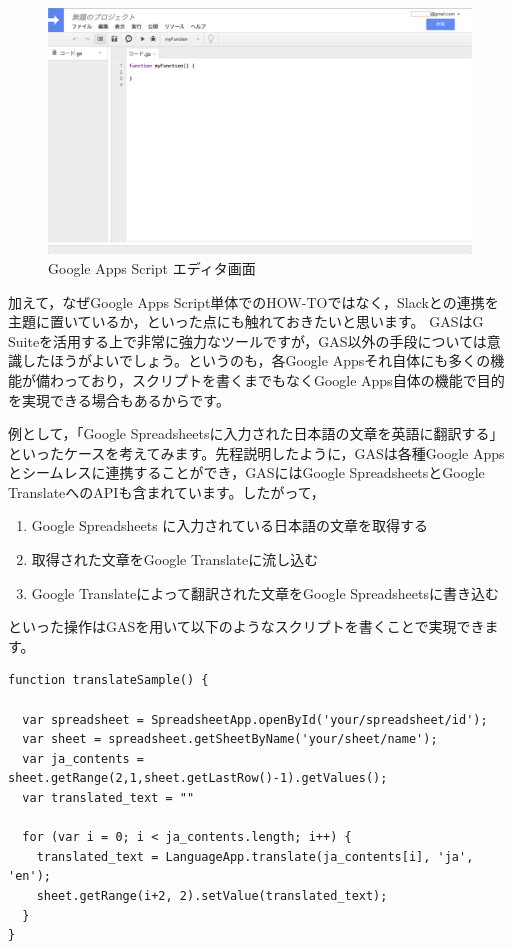 \documentclass[uplatex,a4j]{jsarticle}
\begin{document}
\begin{figure}[H]
 \centering
 \includegraphics[keepaspectratio, scale=0.4]{images/gas_edit.png}
 \caption{Google Apps Script エディタ画面}
 \label{fig:gas_edit}
\end{figure}


加えて，なぜGoogle Apps Script単体でのHOW-TOではなく，Slackとの連携を主題に置いているか，といった点にも触れておきたいと思います。
GASはG Suiteを活用する上で非常に強力なツールですが，GAS以外の手段については意識したほうがよいでしょう。というのも，各Google Appsそれ自体にも多くの機能が備わっており，スクリプトを書くまでもなくGoogle Apps自体の機能で目的を実現できる場合もあるからです。

例として，「Google Spreadsheetsに入力された日本語の文章を英語に翻訳する」といったケースを考えてみます。先程説明したように，GASは各種Google Appsとシームレスに連携することができ，GASにはGoogle SpreadsheetsとGoogle TranslateへのAPIも含まれています。したがって，
\begin{enumerate}
\item Google Spreadsheets に入力されている日本語の文章を取得する
\item 取得された文章をGoogle Translateに流し込む
\item Google Translateによって翻訳された文章をGoogle Spreadsheetsに書き込む
\end{enumerate}
といった操作はGASを用いて以下のようなスクリプトを書くことで実現できます。

 \begin{lstlisting}[basicstyle=\ttfamily\footnotesize,frame=single,caption=Translate Script]
function translateSample() {

  var spreadsheet = SpreadsheetApp.openById('your/spreadsheet/id');
  var sheet = spreadsheet.getSheetByName('your/sheet/name');
  var ja_contents = sheet.getRange(2,1,sheet.getLastRow()-1).getValues();
  var translated_text = ""
  
  for (var i = 0; i < ja_contents.length; i++) {
    translated_text = LanguageApp.translate(ja_contents[i], 'ja', 'en');
    sheet.getRange(i+2, 2).setValue(translated_text);
  }
}
 \end{lstlisting}
\end{document}
